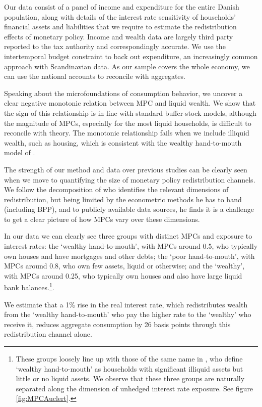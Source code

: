 \documentclass[titlepage]{\econtex}\newcommand{\texname}{ConsumptionHeterogeneity}
\begin{document}
Our data consist of a panel of income and expenditure for the entire Danish population, along with details of the interest rate sensitivity of households' financial assets and liabilities that we require to estimate the redistribution effects of monetary policy. Income and wealth data are largely third party reported to the tax authority and correspondingly accurate. We use the intertemporal budget constraint to back out expenditure, an increasingly common approach with Scandinavian data. As our sample covers the whole economy, we can use the national accounts to reconcile with aggregates.

Speaking about the microfoundations of consumption behavior, we uncover a clear negative monotonic relation between MPC and liquid wealth. We show that the sign of this relationship is in line with standard buffer-stock models, although the magnitude of MPCs, especially for the most liquid households, is difficult to reconcile with theory. The monotonic relationship fails when we include illiquid wealth, such as housing, which is consistent with the wealthy hand-to-mouth model of \cite{violante_wealthy_2014}.

The strength of our method and data over previous studies can be clearly seen when we move to quantifying the size of monetary policy redistribution channels. We follow the decomposition of \cite{auclert_monetary_2017} who identifies the relevant dimensions of redistribution, but being limited by the econometric methods he has to hand (including BPP), and to publicly available data sources, he finds it is a challenge to get a clear picture of how MPCs vary over these dimensions.

In our data we can clearly see three groups with distinct MPCs and exposure to interest rates: the `wealthy hand-to-mouth', with MPCs around 0.5, who typically own houses and have mortgages and other debts; the `poor hand-to-mouth', with MPCs around 0.8, who own few assets, liquid or otherwise; and the `wealthy', with MPCs around 0.25, who typically own houses and also have large liquid bank balances.\footnote{These groups loosely line up with those of the same name in \cite{violante_wealthy_2014}, who define `wealthy hand-to-mouth' as households with significant illiquid assets but little or no liquid assets. We observe that these three groups are naturally separated along the dimension of unhedged interest rate exposure. See figure \ref{fig:MPCAuclert}.}.

We estimate that a 1\% rise in the real interest rate, which redistributes wealth from the `wealthy hand-to-mouth' who pay the higher rate to the `wealthy' who receive it, reduces aggregate consumption by 26 basis points through this redistribution channel alone. 
\end{document}
